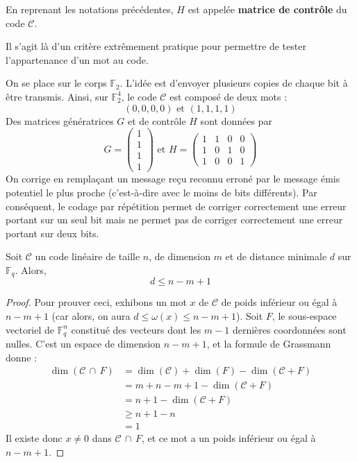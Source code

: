 	\begin{definition}
		En reprenant les notations précédentes, $H$ est appelée \textbf{matrice de contrôle} du code $\mathcal{C}$.
	\end{definition}
	
	Il s'agit là d'un critère extrêmement pratique pour permettre de tester l'appartenance d'un mot au code.
	
	\begin{example}
		On se place sur le corps $\mathbb{F}_2$. L'idée est d'envoyer plusieurs copies de chaque bit à être transmis. Ainsi, sur $\mathbb{F}_2^4$, le code $\mathcal{C}$ est composé de deux mots :
		\[ (0,0,0,0) \text{ et } (1,1,1,1) \]
		Des matrices génératrices $G$ et de contrôle $H$ sont données par
		\[
			G = \begin{pmatrix}
				1 \\
				1 \\
				1 \\
				1
			\end{pmatrix}
			\text{ et }
			H = \begin{pmatrix}
				1 & 1 & 0 & 0 \\
				1 & 0 & 1 & 0 \\
				1 & 0 & 0 & 1
			\end{pmatrix}
		\]
		On corrige en remplaçant un message reçu reconnu erroné par le message émis potentiel le plus proche (c'est-à-dire avec le moins de bits différents). Par conséquent, le codage par répétition permet de corriger correctement une erreur portant sur un seul bit mais ne permet pas de corriger correctement une erreur portant sur deux bits.
	\end{example}
	
	\begin{proposition}
		Soit $\mathcal{C}$ un code linéaire de taille $n$, de dimension $m$ et de distance minimale $d$ sur $\mathbb{F}_q$. Alors,
		\[ d \leq n-m+1 \]
	\end{proposition}
	
	\begin{proof}
		Pour prouver ceci, exhibons un mot $x$ de $\mathcal{C}$ de poids inférieur ou égal à $n-m+1$ (car alors, on aura $d \leq \omega(x) \leq n-m+1$). Soit $F$, le sous-espace vectoriel de $\mathbb{F}_q^n$ constitué des vecteurs dont les $m-1$ dernières coordonnées sont nulles. C'est un espace de dimension $n-m+1$, et la formule de Grassmann donne :
		\begin{align*}
			\dim(\mathcal{C} \, \cap \, F) &= \dim(\mathcal{C}) + \dim(F) - \dim(\mathcal{C} + F) \\
			&= m + n - m + 1 - \dim(\mathcal{C} + F) \\
			&= n + 1 - \dim(\mathcal{C} + F) \\
			&\geq n + 1 - n \\
			&= 1
		\end{align*}
		Il existe donc $x \neq 0$ dans $\mathcal{C} \, \cap \, F$, et ce mot a un poids inférieur ou égal à $n-m+1$.
	\end{proof}
	
